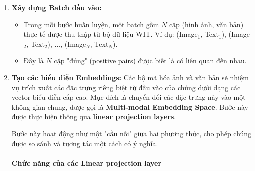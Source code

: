 \begin{enumerate}
    \item \textbf{Xây dựng Batch đầu vào:}
    \begin{itemize}
        \item Trong mỗi bước huấn luyện, một batch gồm $N$ cặp (hình ảnh, văn bản) thực tế được thu thập từ bộ dữ liệu WIT. Ví dụ: (Image$_1$, Text$_1$), (Image$_2$, Text$_2$), ..., (Image$_N$, Text$_N$).
        \item Đây là $N$ cặp "đúng" (positive pairs) được biết là có liên quan đến nhau.
    \end{itemize}

    \item \textbf{Tạo các biểu diễn Embeddings:}
    Các bộ mã hóa ảnh và văn bản sẽ nhiệm vụ trích xuất các đặc trưng riêng biệt từ đầu vào của chúng dưới dạng các vector biểu diễn cấp cao. Mục đích là chuyển đổi các đặc trưng này vào một không gian chung, được gọi là \textbf{Multi-modal Embedding Space}. Bước này được thực hiện thông qua \textbf{linear projection layers}.

    Bước này hoạt động như một "cầu nối" giữa hai phương thức, cho phép chúng được so sánh và tương tác một cách có ý nghĩa.

    \paragraph{Chức năng của các Linear projection layer}


\end{enumerate}
